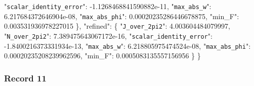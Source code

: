 \documentclass[
  10pt,
]{article}
\newenvironment{Shaded}{}{}
\newcommand{\DataTypeTok}[1]{\textcolor[rgb]{0.56,0.13,0.00}{#1}}
\newcommand{\FloatTok}[1]{\textcolor[rgb]{0.25,0.63,0.44}{#1}}
\newcommand{\FunctionTok}[1]{\textcolor[rgb]{0.02,0.16,0.49}{#1}}
\begin{document}
\begin{Shaded}
\begin{Highlighting}[]
    \DataTypeTok{"\nolinkurl{scalar_identity_error}"}\FunctionTok{:} \FloatTok{{-}1.1268468841590882e{-}11}\FunctionTok{,}
    \DataTypeTok{"\nolinkurl{max_abs_w}"}\FunctionTok{:} \FloatTok{6.217684372646904e{-}08}\FunctionTok{,}
    \DataTypeTok{"\nolinkurl{max_abs_phi}"}\FunctionTok{:} \FloatTok{0.00020235286446678875}\FunctionTok{,}
    \DataTypeTok{"min\_F"}\FunctionTok{:} \FloatTok{0.003531936978227015}
  \FunctionTok{\},}
  \DataTypeTok{"refined"}\FunctionTok{:} \FunctionTok{\{}
    \DataTypeTok{"\nolinkurl{J_over_2pi2}"}\FunctionTok{:} \FloatTok{4.003604484079997}\FunctionTok{,}
    \DataTypeTok{"\nolinkurl{N_over_2pi2}"}\FunctionTok{:} \FloatTok{7.389475643067172e{-}16}\FunctionTok{,}
    \DataTypeTok{"\nolinkurl{scalar_identity_error}"}\FunctionTok{:} \FloatTok{{-}1.8400216373331934e{-}13}\FunctionTok{,}
    \DataTypeTok{"\nolinkurl{max_abs_w}"}\FunctionTok{:} \FloatTok{6.218805975474524e{-}08}\FunctionTok{,}
    \DataTypeTok{"\nolinkurl{max_abs_phi}"}\FunctionTok{:} \FloatTok{0.00020235208239962596}\FunctionTok{,}
    \DataTypeTok{"min\_F"}\FunctionTok{:} \FloatTok{0.0005083135557156956}
  \FunctionTok{\}}
\FunctionTok{\}}
\end{Highlighting}
\end{Shaded}

\hypertarget{record-11}{%
\subsubsection{Record 11}\label{record-11}}
\end{document}
